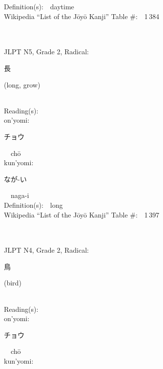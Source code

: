 \begin{multicols}{2}
Definition(s):\ \ daytime \\
Wikipedia ``List of the J\=oy\=o Kanji'' Table \#:\ \ 1\,384 \\
\ \ \\
{\fontsize{34pt}{40pt}  }\ \ \\  %
{JLPT N5, Grade 2, Radical:\ \ {\begin{CJK}{UTF8}{min} 長 \end{CJK}} (long, grow) } \\
Reading(s):\ \ \\
{\hspace*{1em}}on'yomi:\ \ \\
{\hspace*{2em}}{\begin{CJK}{UTF8}{min} チョウ \end{CJK}}\ \ ch\=o\ \ \\
{\hspace*{1em}}kun'yomi:\ \ \\
{\hspace*{2em}}{\begin{CJK}{UTF8}{min} なが-い \end{CJK}}\ \ naga-i\ \ \\
Definition(s):\ \ long \\
Wikipedia ``List of the J\=oy\=o Kanji'' Table \#:\ \ 1\,397 \\
\ \ \\
{\fontsize{34pt}{40pt}  }\ \ \\  %
{JLPT N4, Grade 2, Radical:\ \ {\begin{CJK}{UTF8}{min} 鳥 \end{CJK}} (bird) } \\
Reading(s):\ \ \\
{\hspace*{1em}}on'yomi:\ \ \\
{\hspace*{2em}}{\begin{CJK}{UTF8}{min} チョウ \end{CJK}}\ \ ch\=o\ \ \\
{\hspace*{1em}}kun'yomi:\ \ \\

\end{multicols}
